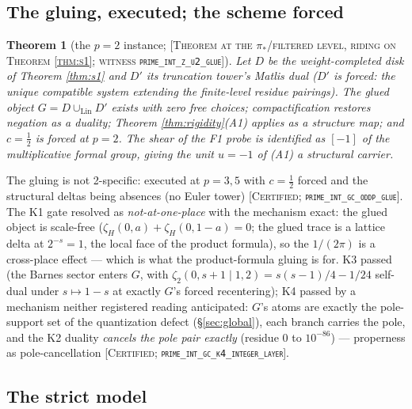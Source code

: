 \documentclass[11pt,reqno]{amsart}
\theoremstyle{plain}
\newtheorem{theorem}{Theorem}[section]
\theoremstyle{definition}
\theoremstyle{remark}
\newcommand{\grade}[1]{\textup{[\textsc{#1}]}}
\begin{document}
\subsection{The gluing, executed; the scheme forced}

\begin{theorem}[the $p=2$ instance; \grade{Theorem at the $\pi_*$/filtered level, riding on
Theorem \ref{thm:s1}; witness \texttt{prime\_\allowbreak int\_\allowbreak z\_\allowbreak u2\_\allowbreak glue}}]\label{thm:glue}
Let $D$ be the weight-completed disk of Theorem \ref{thm:s1} and $D'$ its truncation tower's
Matlis dual ($D'$ is \emph{forced}: the unique compatible system extending the finite-level
residue pairings). The glued object $G = D \cup_{\mathrm{Lin}} D'$ exists with zero free
choices; compactification restores negation as a duality; Theorem \ref{thm:rigidity}(A1)
applies as a structure map; and $c = \tfrac12$ \emph{is forced} at $p = 2$. The shear of the
F1 probe is identified as $[-1]$ of the multiplicative formal group, giving the unit
$u = -1$ of (A1) a structural carrier.
\end{theorem}

The gluing is not 2-specific: executed at $p = 3, 5$ with $c = \tfrac12$ forced and the
structural deltas being absences (no Euler tower)
\grade{Certified; \texttt{prime\_\allowbreak int\_\allowbreak gc\_\allowbreak oddp\_\allowbreak glue}}. The K1 gate resolved as
\emph{not-at-one-place} with the mechanism exact: the glued object is scale-free
($\zeta_H(0,a) + \zeta_H(0,1-a) = 0$; the glued trace is a lattice delta at $2^{-s} = 1$, the
local face of the product formula), so the $1/(2\pi)$ is a cross-place effect --- which is
what the product-formula gluing is for. K3 passed (the Barnes sector enters $G$, with
$\zeta_2(0, s+1 \mid 1,2) = s(s-1)/4 - 1/24$ self-dual under $s \mapsto 1-s$ at exactly $G$'s
forced recentering); K4 passed by a mechanism neither registered reading anticipated:
$G$'s atoms are exactly the pole-support set of the quantization defect (\S\ref{sec:global}),
each branch carries the pole, and the K2 duality \emph{cancels the pole pair exactly}
(residue $0$ to $10^{-86}$) --- properness as pole-cancellation
\grade{Certified; \texttt{prime\_\allowbreak int\_\allowbreak gc\_\allowbreak k4\_\allowbreak integer\_\allowbreak layer}}.

\subsection{The strict model}
\end{document}
